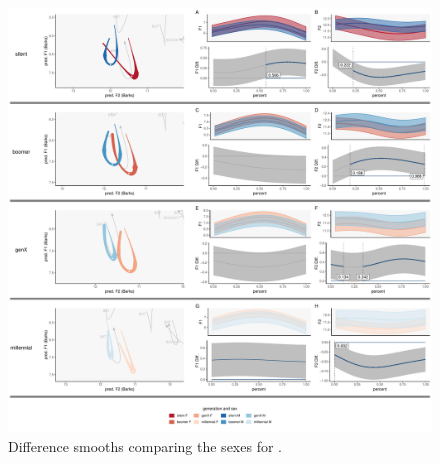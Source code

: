 \begin{figure}[p]
    \centering
    \includegraphics[width=\textwidth]{Figures/BAT/BAT_sex_panel_plot.pdf}
    \caption{Difference smooths comparing the sexes for \bat.}
    \label{fig:bat_diff_smooths_sex_gen}
\end{figure}


